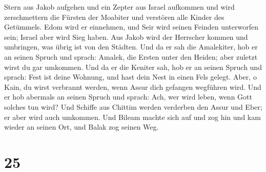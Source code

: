 Stern aus Jakob aufgehen und ein Zepter aus Israel aufkommen und wird
zerschmettern die Fürsten der Moabiter und verstören alle Kinder des
Getümmels.  Edom wird er einnehmen, und Seir wird seinen
Feinden unterworfen sein; Israel aber wird Sieg haben. 
Aus Jakob wird der Herrscher kommen und umbringen, was übrig ist von den
Städten.  Und da er sah die Amalekiter, hob er an seinen
Spruch und sprach: Amalek, die Ersten unter den Heiden; aber zuletzt
wirst du gar umkommen.  Und da er die Keniter sah, hob er
an seinen Spruch und sprach: Fest ist deine Wohnung, und hast dein Nest
in einen Fels gelegt.  Aber, o Kain, du wirst verbrannt
werden, wenn Assur dich gefangen wegführen wird.  Und er
hob abermals an seinen Spruch und sprach: Ach, wer wird leben, wenn Gott
solches tun wird?  Und Schiffe aus Chittim werden
verderben den Assur und Eber; er aber wird auch umkommen.
 Und Bileam machte sich auf und zog hin und kam wieder an
seinen Ort, und Balak zog seinen Weg.

\hypertarget{section-24}{%
\section{25}\label{section-24}}

